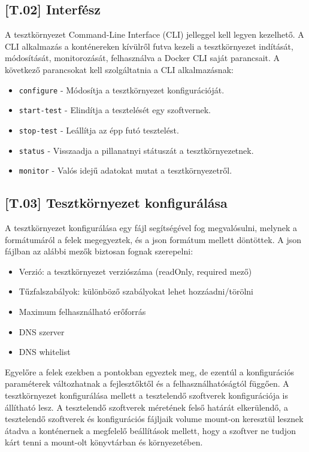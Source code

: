 \documentclass{scrreprt}
\begin{document}
\subsection{[T.02] Interfész} \label{T.02}
A tesztkörnyezet Command-Line Interface (CLI) jelleggel kell legyen kezelhető. A CLI alkalmazás a konténereken kívülről futva kezeli a tesztkörnyezet
indítását, módosítását, monitorozását, felhasználva a Docker CLI saját parancsait. \newline A következő parancsokat kell szolgáltatnia a CLI alkalmazásnak:
\begin{itemize}
      \item \texttt{configure} - Módosítja a tesztkörnyezet konfigurációját.
      \item \texttt{start-test} - Elindítja a tesztelését egy szoftvernek.
      \item \texttt{stop-test} - Leállítja az épp futó tesztelést.
      \item \texttt{status} - Visszaadja a pillanatnyi státuszát a tesztkörnyezetnek.
      \item \texttt{monitor} - Valós idejű adatokat mutat a tesztkörnyezetről.
\end{itemize}

\subsection{[T.03] Tesztkörnyezet konfigurálása} \label{T.03}
A tesztkörnyezet konfigurálása egy fájl segítségével fog megvalósulni, melynek a formátumáról a felek megegyeztek, és a json formátum mellett döntöttek. A json
fájlban az alábbi mezők biztosan fognak szerepelni:
\begin{itemize}
      \item Verzió: a tesztkörnyezet verziószáma (readOnly, required mező)
      \item Tűzfalszabályok: különböző szabályokat lehet hozzáadni/törölni
      \item Maximum felhasználható erőforrás
      \item DNS szerver
      \item DNS whitelist
\end{itemize}
Egyelőre a felek ezekben a pontokban egyeztek meg, de ezentúl a konfigurációs paraméterek változhatnak a fejlesztőktől és a felhasználhatóságtól függően.
\newline
A tesztkörnyezet konfigurálása mellett a tesztelendő szoftverek konfigurációja is állítható lesz. A tesztelendő szoftverek méretének felső határát elkerülendő, a tesztelendő szoftverek és konfigurációs fájljaik volume mount-on keresztül lesznek átadva a konténernek a megfelelő beállítások mellett, hogy a szoftver ne tudjon kárt tenni a mount-olt könyvtárban és környezetében.
\end{document}
